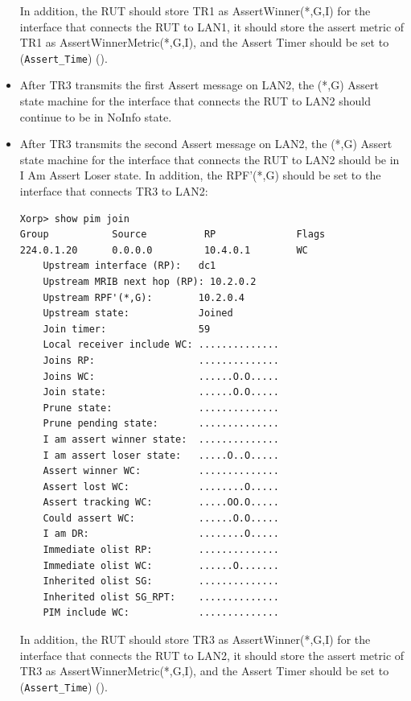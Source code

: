 \documentclass[11pt]{report}
\begin{document}
\begin{itemize}
  In addition, the RUT should store TR1 as AssertWinner(*,G,I) for the
  interface that connects the RUT to LAN1, it should store the assert metric
  of TR1 as AssertWinnerMetric(*,G,I), and the Assert Timer should be set to
  (\verb=Assert_Time=) ({\PimsmAssertTime}).

  \item After TR3 transmits the first Assert message on LAN2, the (*,G) Assert
  state machine for the interface that connects the RUT to LAN2 should
  continue to be in NoInfo state.

  \item After TR3 transmits the second Assert message on LAN2, the (*,G) Assert
  state machine for the interface that connects the RUT to LAN2 should be in I
  Am Assert Loser state. In addition,
  the RPF'(*,G) should be set to the interface that connects TR3
  to LAN2:

\begin{verbatim}
Xorp> show pim join 
Group           Source          RP              Flags
224.0.1.20      0.0.0.0         10.4.0.1        WC   
    Upstream interface (RP):   dc1
    Upstream MRIB next hop (RP): 10.2.0.2
    Upstream RPF'(*,G):        10.2.0.4
    Upstream state:            Joined 
    Join timer:                59
    Local receiver include WC: ..............
    Joins RP:                  ..............
    Joins WC:                  ......O.O.....
    Join state:                ......O.O.....
    Prune state:               ..............
    Prune pending state:       ..............
    I am assert winner state:  ..............
    I am assert loser state:   .....O..O.....
    Assert winner WC:          ..............
    Assert lost WC:            ........O.....
    Assert tracking WC:        .....OO.O.....
    Could assert WC:           ......O.O.....
    I am DR:                   ........O.....
    Immediate olist RP:        ..............
    Immediate olist WC:        ......O.......
    Inherited olist SG:        ..............
    Inherited olist SG_RPT:    ..............
    PIM include WC:            ..............
\end{verbatim}

  In addition, the RUT should store TR3 as AssertWinner(*,G,I) for the
  interface that connects the RUT to LAN2, it should store the assert metric
  of TR3 as AssertWinnerMetric(*,G,I), and the Assert Timer should be set to
  (\verb=Assert_Time=) ({\PimsmAssertTime}).

\end{itemize}
\end{document}
